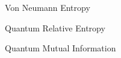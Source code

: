\begin{frame}{Von Neumann Entropy}
    
\end{frame}

\begin{frame}{Quantum Relative Entropy}
    
\end{frame}

\begin{frame}{Quantum Mutual Information}
    
\end{frame}